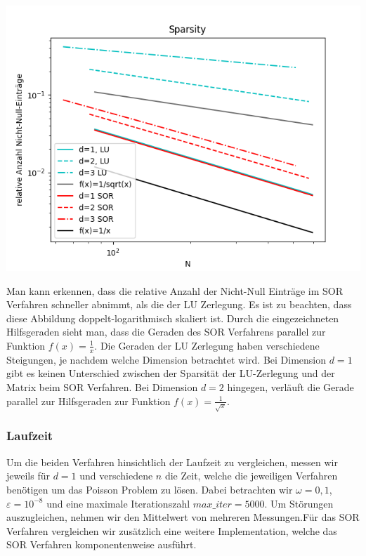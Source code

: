 \documentclass[smallheadings]{scrartcl}
\theoremstyle{definition}
\begin{document}
\begin{minipage}{\textwidth}

 \centering
 \includegraphics[scale = 0.9]{Sparsity1}
 	\label{sparsity}

 \end{minipage}

Man kann erkennen, dass die relative Anzahl der Nicht-Null Einträge im SOR Verfahren schneller abnimmt, als die der LU Zerlegung.  Es ist zu beachten, dass diese Abbildung doppelt-logarithmisch  skaliert ist.  Durch die eingezeichneten Hilfsgeraden sieht man, dass die Geraden des SOR Verfahrens parallel zur Funktion $f(x)=\frac{1}{x}$. Die Geraden der LU Zerlegung haben verschiedene Steigungen,  je nachdem welche Dimension betrachtet wird. Bei Dimension $d=1$ gibt es keinen Unterschied zwischen der Sparsität der LU-Zerlegung und der Matrix beim SOR Verfahren.  Bei Dimension $d=2$ hingegen, verläuft die Gerade parallel zur Hilfsgeraden zur Funktion $f(x)=\frac{1}{\sqrt{x}}$. 

\subsubsection{Laufzeit}
Um die beiden Verfahren hinsichtlich der Laufzeit zu vergleichen,  messen wir jeweils für $d=1$ und verschiedene $n$ die Zeit, welche die jeweiligen Verfahren benötigen um das Poisson Problem zu lösen.  Dabei betrachten wir $\omega =0,1$, $\varepsilon = 10^{-8}$ und eine maximale Iterationszahl $max\_ iter = 5000$.  Um Störungen auszugleichen,  nehmen wir den Mittelwert von mehreren Messungen.Für das SOR Verfahren vergleichen wir zusätzlich eine weitere Implementation,  welche das SOR Verfahren komponentenweise ausführt. 
\end{document}
